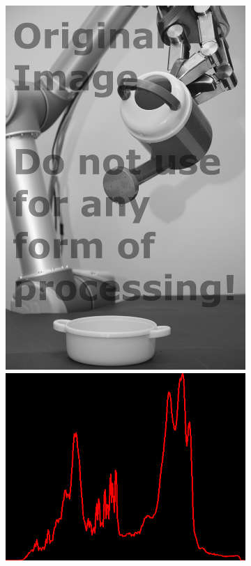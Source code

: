\begin{figure}[H]
\begin{subfigure}[b]{0.28\textwidth}
    \end{subfigure}
    \begin{subfigure}[b]{0.28\textwidth}
        \includegraphics[width=\textwidth]{org.png}\\[0.1cm]
        \includegraphics[width=\textwidth]{img2/hist_eee_org_res_total.png}

\end{subfigure}
\end{figure}
